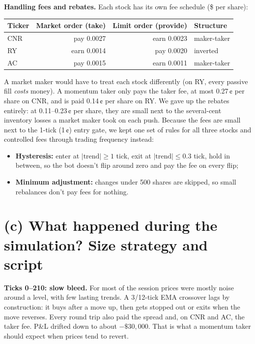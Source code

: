 \documentclass[11pt]{article}
\begin{document}
\textbf{Handling fees and rebates.} Each stock has its own fee schedule
(\$ per share):
\begin{table}[H]
\centering
\small
\begin{tabular}{@{}lrrl@{}}
\toprule
Ticker & Market order (take) & Limit order (provide) & Structure \\
\midrule
CNR & pay 0.0027 & earn 0.0023 & maker-taker \\
RY  & earn 0.0014 & pay 0.0020 & inverted \\
AC  & pay 0.0015 & earn 0.0011 & maker-taker \\
\bottomrule
\end{tabular}
\end{table}
A market maker would have to treat each stock differently (on RY, every passive
fill \emph{costs} money). A momentum taker only pays the taker fee, at most
0.27\,¢ per share on CNR, and is paid 0.14\,¢ per share on RY. We gave up the
rebates entirely: at 0.11--0.23\,¢ per share, they are small next to the
several-cent inventory losses a market maker took on each push. Because the fees
are small next to the 1-tick (1\,¢) entry gate, we kept one set of rules for all
three stocks and controlled fees through trading frequency instead:
\begin{itemize}[leftmargin=1.4em, itemsep=0.2em]
  \item \textbf{Hysteresis:} enter at $|\text{trend}| \ge 1$ tick, exit at
        $|\text{trend}| \le 0.3$ tick, hold in between, so the bot doesn't flip
        around zero and pay the fee on every flip;
  \item \textbf{Minimum adjustment:} changes under 500 shares are skipped, so small
        rebalances don't pay fees for nothing.
\end{itemize}

\section{(c) What happened during the simulation? Size strategy and script}

\textbf{Ticks 0--210: slow bleed.} For most of the session prices were mostly
noise around a level, with few lasting trends. A 3/12-tick EMA crossover lags by
construction: it buys after a move up, then gets stopped out or exits when the move
reverses. Every round trip also paid the spread and, on CNR and AC, the taker fee.
P\&L drifted down to about $-\$30{,}000$. That is what a momentum taker should
expect when prices tend to revert.
\end{document}
